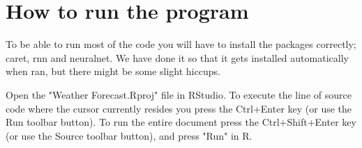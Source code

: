 \documentclass[
11pt, %
english, %
singlespacing, %
parskip, %
headsepline, %
]{report} %
\begin{document}
    \section{How to run the program}
        
        To be able to run most of the code you will have to install the packages correctly; caret, rnn and neuralnet. We have done it so that it gets installed automatically when ran, but there might be some slight hiccups.
        
        Open the "Weather Forecast.Rproj" file in RStudio. To execute the line of source code where the cursor currently resides you press the Ctrl+Enter key (or use the Run toolbar button). To run the entire document press the Ctrl+Shift+Enter key (or use the Source toolbar button), and press "Run" in R.

\newpage

    \printbibliography[heading=bibintoc]
\end{document}
